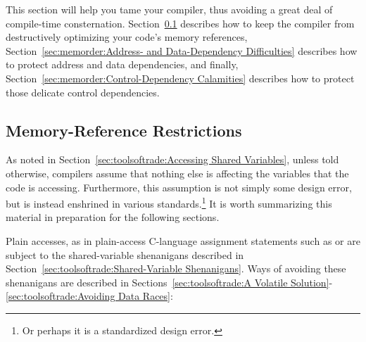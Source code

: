 This section will help you tame your compiler, thus avoiding a great
deal of compile-time consternation.
Section~\ref{sec:memorder:Memory-Reference Restrictions}
describes how to keep the compiler from destructively optimizing
your code's memory references,
Section~\ref{sec:memorder:Address- and Data-Dependency Difficulties}
describes how to protect address and data dependencies,
and finally,
Section~\ref{sec:memorder:Control-Dependency Calamities}
describes how to protect those delicate control dependencies.

\subsection{Memory-Reference Restrictions}
\label{sec:memorder:Memory-Reference Restrictions}

As noted in Section~\ref{sec:toolsoftrade:Accessing Shared Variables},
unless told otherwise, compilers assume that nothing else
is affecting the variables that the code is accessing.
Furthermore, this assumption is not simply some design error, but is
instead enshrined in various standards.\footnote{
	Or perhaps it is a standardized design error.}
It is worth summarizing this material in preparation for the following
sections.

Plain accesses, as in plain-access C-language assignment statements such
as  or  are subject to the
shared-variable shenanigans described in
Section~\ref{sec:toolsoftrade:Shared-Variable Shenanigans}.
Ways of avoiding these shenanigans are described in
Sections~\ref{sec:toolsoftrade:A Volatile Solution}-\ref{sec:toolsoftrade:Avoiding Data Races}:

